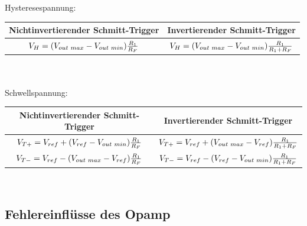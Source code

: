 			\begin{minipage}{18cm}
               	Hysteresespannung:\\
               	\hspace*{10mm}
               	\begin{tabular}{| c | c |}
                \hline
                Nichtinvertierender Schmitt-Trigger & Invertierender
                Schmitt-Trigger\\
                \hline
                $V_H=(V_{out \hspace{1mm} max}-V_{out \hspace{1mm}
                min})\frac{R_1}{R_F}$ &
                $V_H=(V_{out \hspace{1mm} max}-V_{out \hspace{1mm}
                min})\frac{R_1}{R_1+R_F}$\\
                \hline
            \end{tabular}\\ \\
				Schwellspannung:\\
				\hspace*{10mm}
			\begin{tabular}{| c | c |}
                \hline
                Nichtinvertierender Schmitt-Trigger & Invertierender
                Schmitt-Trigger\\
                \hline
                $V_{T+}=V_{ref}+(V_{ref}-V_{out
                \hspace{1mm} min})\frac{R_1}{R_F}$ &
                $V_{T+}=V_{ref}+(V_{out \hspace{1mm}
                max}-V_{ref})\frac{R_1}{R_1+R_F}$\\
                \hline
                $V_{T-}=V_{ref}-(V_{out
                \hspace{1mm} max}-V_{ref})\frac{R_1}{R_F}$ &
                $V_{T-}=V_{ref}-(V_{ref}-V_{out \hspace{1mm}
                min})\frac{R_1}{R_1+R_F}$\\
                \hline
            \end{tabular}\\
            \end{minipage}
	


	\subsection{Fehlereinflüsse des Opamp}
